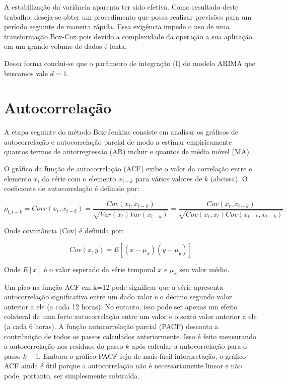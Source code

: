 \documentclass[
	12pt,				%
	openright,			%
	oneside,			%
	a4paper,			%
	english,			%
	french,				%
	spanish,			%
	brazil				%
	]{abntex2}
\begin{document}
A estabilização da variância aparenta ter sido efetiva. Como resultado deste trabalho, deseja-se obter um procedimento que possa realizar previsões para um período seguinte de maneira rápida. Essa exigência impede o uso de uma transformação Box-Cox pois devido a complexidade da operação a sua aplicação em um grande volume de dados é lenta.

Dessa forma conclui-se que o parâmetro de integração (I) do modelo ARIMA que buscamos vale $d=1$.

\section{Autocorrelação}

A etapa seguinte do método Box-Jenkins consiste em analisar os gráficos de autocorrelação e autocorrelação parcial de modo a estimar empiricamente quantos termos de autorregressão (AR) incluir e quantos de média móvel (MA).

O gráfico da função de autocorrelação (ACF) exibe o valor da correlação entre o elemento $x_i$ da série com o elemento $x_{i-k}$ para vários valores de $k$ (abcissa). O coeficiente de autocorrelação é definido por:

\begin{equation}
\rho_{t,t-k} = Corr(x_t, x_{t-k}) = \frac{Cov(x_t, x_{t-k})}{\sqrt{Var(x_t)Var(x_{t-k})}} = \frac{Cov(x_t, x_{t-k})}{\sqrt{Cov(x_t,x_t)Cov(x_{t-k},x_{t-k})}}
\end{equation}

Onde covariância (Cov) é definida por:

\begin{equation}
Cov(x,y) = E\left[(x-\mu_x)(y-\mu_y)\right]
\end{equation}

Onde $E[x]$ é o valor esperado da série temporal $x$ e $\mu_x$ seu valor médio.

Um pico na função ACF em k=12 pode significar que a série apresenta autocorrelação significativa entre um dado valor e o décimo segundo valor anterior a ele (a cada 12 horas). No entanto, isso pode ser apenas um efeito colateral de uma forte autocorrelação entre um valor e o sexto valor anterior a ele (a cada 6 horas). A função autocorrelação parcial (PACF) desconta a contribuição de todos os passos calculados anteriormente. Isso é feito mensurando a autocorrelação nos resíduos do passo $k$ após calcular a autocorrelação para o passo $k-1$. Embora o gráfico PACF seja de mais fácil interpretação, o gráfico ACF ainda é útil porque a autocorrelação não é necessariamente linear e não pode, portanto, ser simplesmente subtraída.
\end{document}
